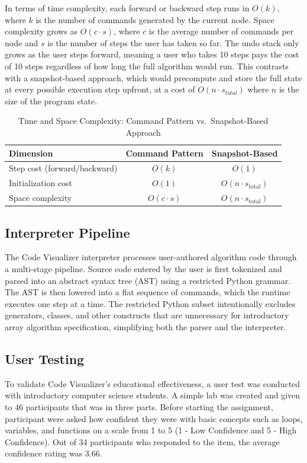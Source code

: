 \documentclass{IEEEtran}
\begin{document}
In terms of time complexity, each forward or backward step runs in $O(k)$, where $k$ is the number of commands generated by the current node. Space complexity grows as $O(c \cdot s)$, where $c$ is the average number of commands per node and $s$ is the number of steps the user has taken so far. The undo stack only grows as the user steps forward, meaning a user who takes 10 steps pays the cost of 10 steps regardless of how long the full algorithm would run. This contrasts with a snapshot-based approach, which would precompute and store the full state at every possible execution step upfront, at a cost of $O(n \cdot s_{total})$ where $n$ is the size of the program state.

\begin{table}[h]
\centering
\scriptsize
\caption{Time and Space Complexity: Command Pattern vs.\ Snapshot-Based Approach}
\label{tab:complexity}
\renewcommand{\arraystretch}{1.3}
\begin{tabular}{|l|c|c|}
\hline
\textbf{Dimension} & \textbf{Command Pattern} & \textbf{Snapshot-Based} \\ \hline
Step cost (forward/backward) & $O(k)$ & $O(1)$ \\ \hline
Initialization cost & $O(1)$ & $O(n \cdot s_{\text{total}})$ \\ \hline
Space complexity & $O(c \cdot s)$ & $O(n \cdot s_{\text{total}})$ \\ \hline
\end{tabular}
\end{table}

\subsection{Interpreter Pipeline}
The Code Visualizer interpreter processes user-authored algorithm code through a multi-stage pipeline. Source code entered by the user is first tokenized and parsed into an abstract syntax tree (AST) using a restricted Python grammar. The AST is then lowered into a flat sequence of commands, which the runtime executes one step at a time. The restricted Python subset intentionally excludes generators, classes, and other constructs that are unnecessary for introductory array algorithm specification, simplifying both the parser and the interpreter.

\subsection{User Testing}
To validate Code Visualizer's educational effectiveness, a user test was conducted with introductory computer science students. A simple lab was created and given to 46 participants that was in three parts. Before starting the assignment, participant were asked how confident they were with basic concepts such as loops, variables, and functions on a scale from 1 to 5 (1 - Low Confidence and 5 - High Confidence). Out of 34 participants who responded to the item, the average confidence rating was 3.66.
\end{document}
